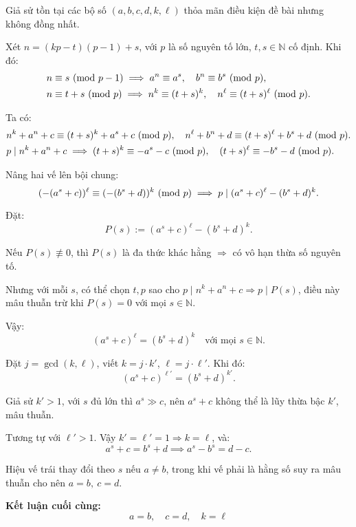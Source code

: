 \documentclass[../05-modular-arithmetic-a.tex]{subfiles}
\begin{document}
\begin{soln}\footnotemark
	Giả sử tồn tại các bộ số \( (a, b, c, d, k, \ell) \) thỏa mãn điều kiện đề bài nhưng không đồng nhất.

	Xét \( n = (kp - t)(p - 1) + s \), với \( p \) là số nguyên tố lớn, \( t, s \in \mathbb{N} \) cố định. Khi đó:
	\[
		\begin{aligned}
			n &\equiv s \ (\mathrm{mod}\ p - 1) \implies a^n \equiv a^s,\quad b^n \equiv b^s \ (\mathrm{mod}\ p), \\
			n &\equiv t + s \ (\mathrm{mod}\ p) \implies n^k \equiv (t + s)^k,\quad n^\ell \equiv (t + s)^\ell \ (\mathrm{mod}\ p).
		\end{aligned}
	\]

	Ta có:
	\[
		\begin{aligned}
			&n^k + a^n + c \equiv (t + s)^k + a^s + c \ (\mathrm{mod}\ p),\quad
			n^\ell + b^n + d \equiv (t + s)^\ell + b^s + d \ (\mathrm{mod}\ p).\\
			&p \mid n^k + a^n + c \implies (t + s)^k \equiv -a^s - c \ (\mathrm{mod}\ p),\quad (t + s)^\ell \equiv -b^s - d \ (\mathrm{mod}\ p).
		\end{aligned}
	\]

	Nâng hai vế lên bội chung:
	\[
		(-(a^s + c))^\ell \equiv (-(b^s + d))^k \ (\mathrm{mod}\ p) \implies p \mid (a^s + c)^\ell - (b^s + d)^k.
	\]

	Đặt:
	\[
	P(s) := (a^s + c)^\ell - (b^s + d)^k.
	\]

	Nếu \( P(s) \not\equiv 0 \), thì \( P(s) \) là đa thức khác hằng \( \Rightarrow \) có vô hạn thừa số nguyên tố.

	Nhưng với mỗi \( s \), có thể chọn \( t, p \) sao cho \( p \mid n^k + a^n + c \Rightarrow p \mid P(s) \), điều này mâu thuẫn trừ khi \( P(s) = 0 \) với mọi \( s \in \mathbb{N} \).

	Vậy:
	\[
		(a^s + c)^\ell = (b^s + d)^k\quad \text{với mọi } s \in \mathbb{N}.
	\]

	Đặt \( j = \gcd(k, \ell) \), viết \( k = j \cdot k' \), \( \ell = j \cdot \ell' \). Khi đó:
	\[
		(a^s + c)^{\ell'} = (b^s + d)^{k'}.
	\]

	Giả sử \( k' > 1 \), với \( s \) đủ lớn thì $a^s \gg c$, nên $a^s + c$ không thể là lũy thừa bậc \( k' \), mâu thuẫn.

	Tương tự với \( \ell' > 1 \). Vậy \( k' = \ell' = 1 \Rightarrow k = \ell \), và:
	\[
		a^s + c = b^s + d \implies a^s - b^s = d - c.
	\]

	Hiệu vế trái thay đổi theo \( s \) nếu \( a \ne b \), trong khi vế phải là hằng số suy ra mâu thuẫn cho nên \( a = b,\ c = d \).

	\textbf{Kết luận cuối cùng:}
	\[
		\boxed{a = b, \quad c = d, \quad k = \ell}
	\]
\end{soln}

\end{document}
